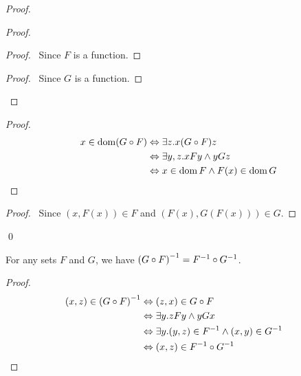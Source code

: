 \begin{proof}
    \pf
    \begin{proof}
        \begin{proof}
            \pf\ Since $F$ is a function.
        \end{proof}
        \begin{proof}
            \pf\ Since $G$ is a function.
        \end{proof}
    \end{proof}
    \begin{proof}
        \pf
        \begin{align*}
            x \in \operatorname{dom} (G \circ F) & \Leftrightarrow \exists z. x(G \circ F)z \\
            & \Leftrightarrow \exists y, z. xFy \wedge yGz \\
            & \Leftrightarrow x \in \operatorname{dom} F \wedge F(x) \in \operatorname{dom} G
        \end{align*}
    \end{proof}
    \begin{proof}
        \pf\ Since $(x,F(x)) \in F$ and $(F(x),G(F(x))) \in G$.
    \end{proof}
    \qed
\end{proof}

\begin{theorem}
    For any sets $F$ and $G$, we have ${(G \circ F)}^{-1} = {F}^{-1} \circ {G}^{-1}$.
\end{theorem}

\begin{proof}
    \pf
    \begin{align*}
        (x,z) \in {(G \circ F)}^{-1} & \Leftrightarrow (z,x) \in G \circ F \\
        & \Leftrightarrow \exists y. zFy \wedge yGx \\
        & \Leftrightarrow \exists y. (y,z) \in {F}^{-1} \wedge (x,y) \in {G}^{-1} \\
        & \Leftrightarrow (x,z) \in {F}^{-1} \circ {G}^{-1} & \relax
    \end{align*}
\end{proof}

